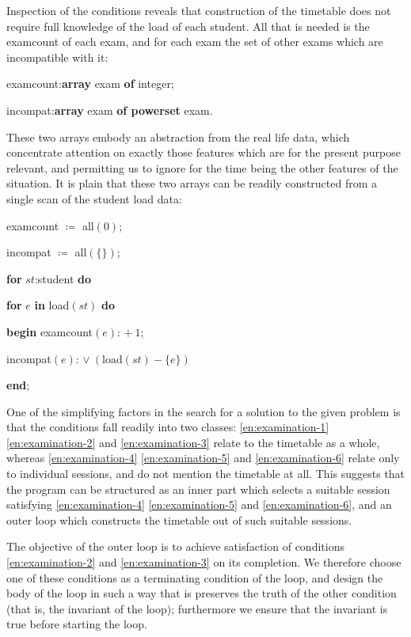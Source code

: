 Inspection of the conditions reveals that construction of the timetable does not require full knowledge of the load of each student. All that is needed is the examcount of each exam, and for each exam the set of other exams which are incompatible with it:

\quad examcount:\textbf{array} exam \textbf{of} integer;

\quad incompat:\textbf{array} exam \textbf{of powerset} exam.

\noindent
These two arrays embody an abstraction from the real life data, which concentrate attention on exactly those features which are for the present purpose relevant, and permitting us to ignore for the time being the other features of the situation. It is plain that these two arrays can be readily constructed from a single scan of the student load data:

\quad examcount $\coloneq$ all$(0)$;

\quad incompat $\coloneq$ all$(\{\})$;

\quad \textbf{for} $st$:student \textbf{do}

\quad \quad \textbf{for} $e$ \textbf{in} load$(st)$ \textbf{do}

\quad \quad \quad \textbf{begin} examcount$(e)$: $+\ 1$;

\quad \quad \quad \quad incompat$(e)$: $\vee\ (\text{load}(st) - \{e\})$

\quad \quad \quad \textbf{end};

One of the simplifying factors in the search for a solution to the given problem is that the conditions fall readily into two classes: \ref{en:examination-1} \ref{en:examination-2} and \ref{en:examination-3} relate to the timetable as a whole, whereas \ref{en:examination-4} \ref{en:examination-5} and \ref{en:examination-6} relate only to individual sessions, and do not mention the timetable at all. This suggests that the program can be structured as an inner part which selects a suitable session satisfying \ref{en:examination-4} \ref{en:examination-5} and \ref{en:examination-6}, and an outer loop which constructs the timetable out of such suitable sessions.

The objective of the outer loop is to achieve satisfaction of conditions \ref{en:examination-2} and \ref{en:examination-3} on its completion. We therefore choose one of these conditions as a terminating condition of the loop, and design the body of the loop in such a way that is preserves the truth of the other condition (that is, the invariant of the loop); furthermore we ensure that the invariant is true before starting the loop.

